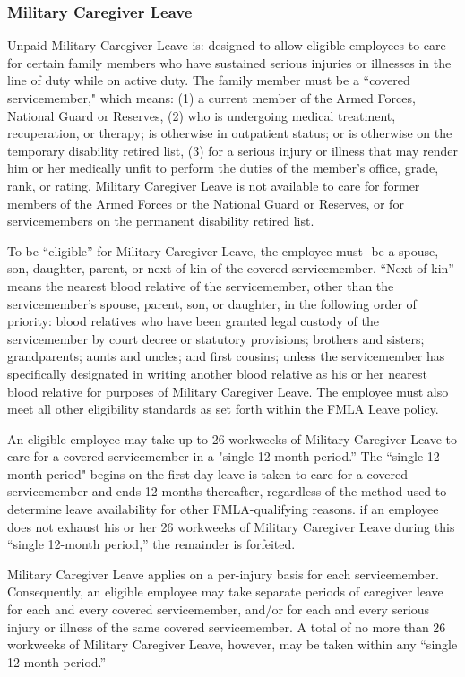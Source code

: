 \documentclass{book}
\begin{document}
\subsubsection{Military Caregiver Leave}

Unpaid Military Caregiver Leave is: designed to allow eligible employees to care for certain family members who have sustained serious injuries or illnesses in the line of duty while on active duty. The family member must be a “covered servicemember," which means: (1) a current member of the Armed Forces, National Guard or Reserves, (2) who is undergoing medical treatment, recuperation, or therapy; is otherwise in outpatient status; or is otherwise on the temporary disability retired list, (3) for a serious injury or illness that may render him or her medically unfit to perform the duties of the member's office, grade, rank, or rating. Military Caregiver Leave is not available to care for former members of the Armed Forces or the National Guard or Reserves, or for servicemembers on the permanent disability retired list.

To be “eligible” for Military Caregiver Leave, the employee must -be a spouse, son, daughter, parent, or next of kin of the covered servicemember. “Next of kin” means the nearest blood relative of the servicemember, other than the servicemember’s spouse, parent, son, or daughter, in the following order of priority: blood relatives who have been granted legal custody of the servicemember by court decree or statutory provisions; brothers and sisters; grandparents; aunts and uncles; and first cousins; unless the servicemember has specifically designated in writing another blood relative as his or her nearest blood relative for purposes of Military Caregiver Leave. The employee must also meet all other eligibility standards as set forth within the FMLA Leave policy.

An eligible employee may take up to 26 workweeks of Military Caregiver Leave to care for a covered servicemember in a "single 12-month period.” The “single 12-month period" begins on the first day leave is taken to care for a covered servicemember and ends 12 months thereafter, regardless of the method used to determine leave availability for other FMLA-qualifying reasons. if an employee does not exhaust his or her 26 workweeks of Military Caregiver Leave during this “single 12-month period,” the remainder is forfeited.

Military Caregiver Leave applies on a per-injury basis for each servicemember. Consequently, an eligible employee may take separate periods of caregiver leave for each and every covered servicemember, and/or for each and every serious injury or illness of the same covered servicemember. A total of no more than 26 workweeks of Military Caregiver Leave, however, may be taken within any “single 12-month period.”
\end{document}
